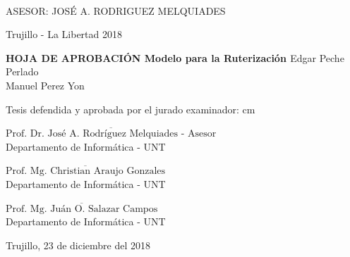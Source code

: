 \begin{center}
   {\bf {\fontsize{14}{16.8}\selectfont{EDGAR PECHE PERLADO}}}\\    
      {\bf {\fontsize{14}{16.8}\selectfont{MANUEL PEREZ YON}}}       
   \end{center}   

\vskip 3.2cm
\begin{center}
   {\bf \doublespacing {\fontsize{17}{20.4}\selectfont{MODELO PARA LA RUTERIZACIÓN }}}     
\end{center}   
  \vskip 2cm
\begin{verse}
 \fontsize{12}{14.4}
\end{verse}

\vskip 1.5cm 
{\fontsize{14}{16.8}\selectfont ASESOR: JOSÉ A. RODRIGUEZ MELQUIADES} 
 \vskip 1cm 
 \begin{center}    
 \vskip 2cm
{\fontsize{14}{16.8}\selectfont Trujillo - La Libertad
\vskip 0.2cm
\hspace*{-0.2cm} 
2018}
\end{center} 
\newpage


\begin{center}
 {\bf {\Large HOJA DE APROBACIÓN }     
 \vskip 1.5cm
  {\Large Modelo para la Ruterización }}
 \vskip 1cm 
  {\large{Edgar Peche Perlado}}\\
    {\large{Manuel Perez Yon}}

 \vskip 1cm
\end{center} 
Tesis defendida y aprobada por el jurado examinador:
 cm
\begin{flushleft} 
$\overline{\mbox{Prof. Dr. José A. Rodríguez Melquiades - Asesor}}$\\
\vskip -0.5cm
Departamento de Informática - UNT
\end{flushleft} 
\vskip 1cm
\begin{flushleft} 
$\overline{\mbox{Prof. Mg. Christian Araujo Gonzales}}$\\
\vskip -0.5cm
Departamento de Informática - UNT
\end{flushleft} 
\vskip 1cm
\begin{flushleft} 
$\overline{\mbox{Prof. Mg. Juán O. Salazar Campos}}$\\
\vskip -0.5cm
Departamento de Informática - UNT
\end{flushleft}
\vskip 0.8cm 
\begin{center}    
Trujillo, 23 de diciembre del 2018
\end{center} 
\newpage


